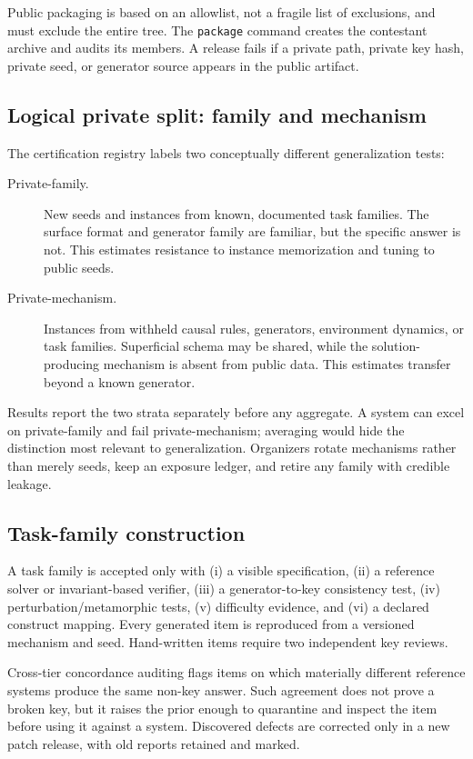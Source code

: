 \documentclass[11pt]{article}
\theoremstyle{definition}
\begin{document}
Public packaging is based on an allowlist, not a fragile list of exclusions, and must exclude the entire  tree. The \texttt{package} command creates the contestant archive and audits its members. A release fails if a private path, private key hash, private seed, or generator source appears in the public artifact.

\subsection{Logical private split: family and mechanism}

The certification registry labels two conceptually different generalization tests:

\begin{description}
\item[Private-family.] New seeds and instances from known, documented task families. The surface format and generator family are familiar, but the specific answer is not. This estimates resistance to instance memorization and tuning to public seeds.
\item[Private-mechanism.] Instances from withheld causal rules, generators, environment dynamics, or task families. Superficial schema may be shared, while the solution-producing mechanism is absent from public data. This estimates transfer beyond a known generator.
\end{description}

Results report the two strata separately before any aggregate. A system can excel on private-family and fail private-mechanism; averaging would hide the distinction most relevant to generalization. Organizers rotate mechanisms rather than merely seeds, keep an exposure ledger, and retire any family with credible leakage.

\subsection{Task-family construction}

A task family is accepted only with (i) a visible specification, (ii) a reference solver or invariant-based verifier, (iii) a generator-to-key consistency test, (iv) perturbation/metamorphic tests, (v) difficulty evidence, and (vi) a declared construct mapping. Every generated item is reproduced from a versioned mechanism and seed. Hand-written items require two independent key reviews.

Cross-tier concordance auditing flags items on which materially different reference systems produce the same non-key answer. Such agreement does not prove a broken key, but it raises the prior enough to quarantine and inspect the item before using it against a system. Discovered defects are corrected only in a new patch release, with old reports retained and marked.
\end{document}

